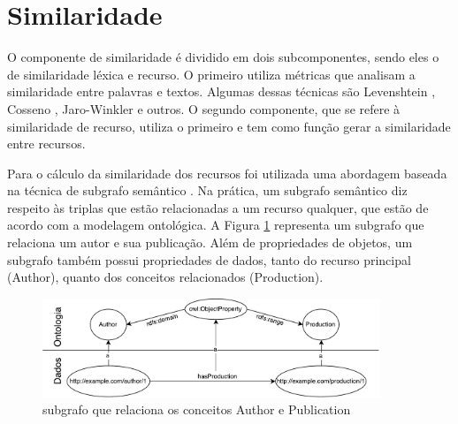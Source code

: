 \section{Similaridade}
O componente de similaridade é dividido em dois subcomponentes, sendo eles o de similaridade léxica e recurso. O primeiro utiliza métricas que analisam a similaridade entre palavras e textos. Algumas dessas técnicas são Levenshtein \cite{levenshtein1966binary}, Cosseno \cite{singhal2001modern}, Jaro-Winkler \cite{winkler1990string} e outros. O segundo componente, que se refere à similaridade de recurso, utiliza o primeiro e tem como função gerar a similaridade entre recursos.

Para o cálculo da similaridade dos recursos foi utilizada uma abordagem baseada na técnica de subgrafo semântico \cite{wang2008lily}. Na prática, um subgrafo semântico diz respeito às triplas que estão relacionadas a um recurso qualquer, que estão de acordo com a modelagem ontológica. A Figura \ref{fig:subgrafo} representa um subgrafo que relaciona um autor e sua publicação. Além de propriedades de objetos, um subgrafo também possui propriedades de dados, tanto do recurso principal (Author), quanto dos conceitos relacionados (Production). %

\begin{figure}[!ht]
	\centering
	\includegraphics[width=0.9\textwidth]{./imagens/subgrafo_semantico.pdf}
    \caption{subgrafo que relaciona os conceitos Author e Publication}
	\label{fig:subgrafo}
\end{figure}



